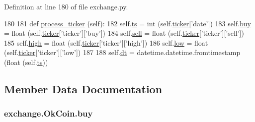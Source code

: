 Definition at line 180 of file exchange.\-py.


\begin{DoxyCode}
180 
181     \textcolor{keyword}{def }\hyperlink{classexchange_1_1_ok_coin_a68de0ed0c8e15df62ee3c116127d960b}{process\_ticker} (self):
182         self.\hyperlink{classexchange_1_1_ok_coin_a0fe6263a7f58a6fa8a688929976b7e4a}{ts}   = int   (self.\hyperlink{classexchange_1_1_exchange_a7cf9e52f993627955a2e242c388daaeb}{ticker}[\textcolor{stringliteral}{'date'}])
183         self.\hyperlink{classexchange_1_1_ok_coin_aaf828e37142a83cbfb12d193313f6d43}{buy}  = float (self.\hyperlink{classexchange_1_1_exchange_a7cf9e52f993627955a2e242c388daaeb}{ticker}[\textcolor{stringliteral}{'ticker'}][\textcolor{stringliteral}{'buy'}])
184         self.\hyperlink{classexchange_1_1_ok_coin_aadb487d2e2f277374a747e1bcb0bd40b}{sell} = float (self.\hyperlink{classexchange_1_1_exchange_a7cf9e52f993627955a2e242c388daaeb}{ticker}[\textcolor{stringliteral}{'ticker'}][\textcolor{stringliteral}{'sell'}])
185         self.\hyperlink{classexchange_1_1_ok_coin_af9d9dbcfc86404510e7f9a5704e8eecd}{high} = float (self.\hyperlink{classexchange_1_1_exchange_a7cf9e52f993627955a2e242c388daaeb}{ticker}[\textcolor{stringliteral}{'ticker'}][\textcolor{stringliteral}{'high'}])
186         self.\hyperlink{classexchange_1_1_ok_coin_a1afa53e0ad63830d0585288abea42094}{low}  = float (self.\hyperlink{classexchange_1_1_exchange_a7cf9e52f993627955a2e242c388daaeb}{ticker}[\textcolor{stringliteral}{'ticker'}][\textcolor{stringliteral}{'low'}])
187     
188         self.\hyperlink{classexchange_1_1_ok_coin_ade9d7cddcfa54f2b1ba5452854bfd48b}{dt} = datetime.datetime.fromtimestamp (float (self.\hyperlink{classexchange_1_1_ok_coin_a0fe6263a7f58a6fa8a688929976b7e4a}{ts}))
    
\end{DoxyCode}


\subsection{Member Data Documentation}
\hypertarget{classexchange_1_1_ok_coin_aaf828e37142a83cbfb12d193313f6d43}{
\subsubsection[{buy}]{\setlength{\rightskip}{0pt plus 5cm}exchange.\-Ok\-Coin.\-buy}}\label{classexchange_1_1_ok_coin_aaf828e37142a83cbfb12d193313f6d43}


